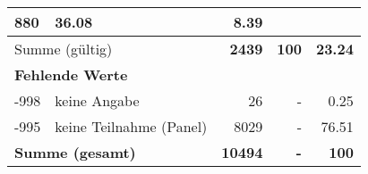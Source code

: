 \begin{longtable}{lXrrr}
       \num{880} &
       \num[round-mode=places,round-precision=2]{36.08} &
         \num[round-mode=places,round-precision=2]{8.39} \\
     \midrule
     \multicolumn{2}{l}{Summe (gültig)} &
       \textbf{\num{2439}} &
     \textbf{\num{100}} &
       \textbf{\num[round-mode=places,round-precision=2]{23.24}} \\
     \multicolumn{5}{l}{\textbf{Fehlende Werte}}\\
       -998 &
       keine Angabe &
         \num{26} &
        - &
         \num[round-mode=places,round-precision=2]{0.25} \\
       -995 &
       keine Teilnahme (Panel) &
         \num{8029} &
        - &
         \num[round-mode=places,round-precision=2]{76.51} \\
     \midrule
     \multicolumn{2}{l}{\textbf{Summe (gesamt)}} &
          \textbf{\num{10494}} &
        \textbf{-} &
        \textbf{\num{100}} \\
     \bottomrule
     \end{longtable}
     
